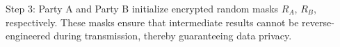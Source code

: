 \documentclass[final,1p,times]{elsarticle}
\begin{document}
Step 3: Party A and Party B initialize encrypted random masks $R_A$, $R_B$, respectively. These masks ensure that intermediate results cannot be reverse-engineered during transmission, thereby guaranteeing data privacy.
\end{document}
